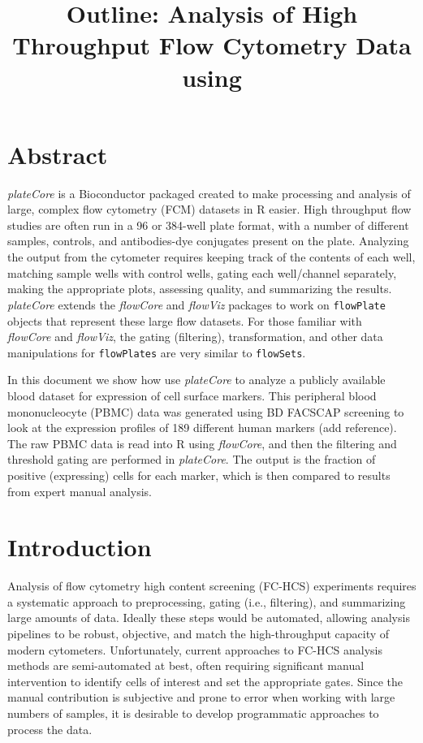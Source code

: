 \documentclass[12pt]{article}
\title{Outline: Analysis of High Throughput Flow Cytometry Data using \Rpackage{plateCore}}
\newcommand{\Rclass}[1]{{\texttt{#1}}}
\newcommand{\Rpackage}[1]{{\textit{#1}}}
\begin{document}
\maketitle

\tableofcontents

\section{Abstract}
\Rpackage{plateCore} is a Bioconductor packaged created to make processing and analysis of large, complex flow cytometry (FCM) datasets
in R easier. High throughput flow studies are often run in a 96 or 384-well plate format, with a number of different samples, 
controls, and antibodies-dye conjugates present on the plate. Analyzing the output from the cytometer requires keeping track of the contents
of each well, matching sample wells with control wells, gating each well/channel separately, making the appropriate plots, assessing quality, and
summarizing the results. \Rpackage{plateCore} extends the \Rpackage{flowCore} and \Rpackage{flowViz} packages to work on
\Rclass{flowPlate} objects that represent these large flow datasets. For those familiar with\\
\Rpackage{flowCore} and \Rpackage{flowViz}, the gating (filtering), transformation, and other data manipulations for \Rclass{flowPlates} 
are very similar to \Rclass{flowSets}. 

In this document we show how use \Rpackage{plateCore} to analyze a publicly available blood dataset for expression of cell surface markers. 
This peripheral blood mononucleocyte (PBMC) data was generated using BD FACS\texttrademark CAP screening to look at the expression profiles of 189 
different human markers (add reference). The raw PBMC data is read into R using \Rpackage{flowCore}, and then the filtering and 
threshold gating are performed in \Rpackage{plateCore}. The output is the fraction of positive (expressing) cells for
each marker, which is then compared to results from expert manual analysis.

\section{Introduction}
Analysis of flow cytometry high content screening (FC-HCS) experiments requires a systematic approach to
preprocessing, gating (i.e., filtering), and summarizing large amounts of data. Ideally these steps would be automated,
allowing analysis pipelines to be robust, objective, and match the high-throughput capacity of modern cytometers. 
Unfortunately, current approaches to FC-HCS analysis methods are semi-automated at best,
often requiring significant manual intervention to identify cells of interest and set the appropriate gates. 
Since the manual contribution is subjective and prone to error when working with large numbers of samples, it
is desirable to develop programmatic approaches to process the data.
\end{document}
